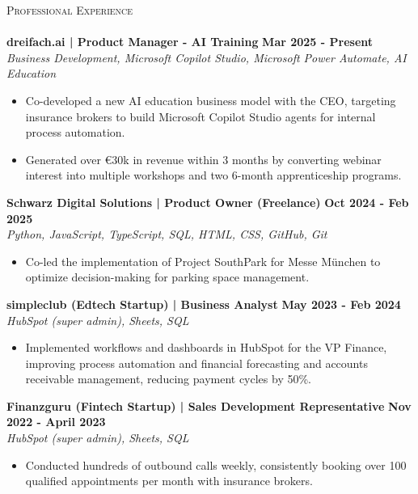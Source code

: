 \documentclass[a4paper]{article}
\newcommand{\lineunder} {
    \vspace*{-8pt} \\
    \hspace*{-18pt} \hrulefill \\
}
\newcommand{\header} [1] {
    {\hspace*{-18pt}\vspace*{6pt} \textsc{#1}}
    \vspace*{-6pt} \lineunder
}
\begin{document}
\header{Professional Experience}
\textbf{dreifach.ai | Product Manager - AI Training} \hfill \textbf{ Mar 2025 - Present}\\
\textit{Business Development, Microsoft Copilot Studio, Microsoft Power Automate, AI Education}
\vspace{-2mm}
\begin{itemize} \itemsep -2pt
    \item Co-developed a new AI education business model with the CEO, targeting insurance brokers to build Microsoft Copilot Studio agents for internal process automation.
    \item Generated over €30k in revenue within 3 months by converting webinar interest into multiple workshops and two 6-month apprenticeship programs.
\end{itemize}
\vspace{-1mm}
\textbf{Schwarz Digital Solutions | Product Owner (Freelance)} \hfill \textbf{ Oct 2024 - Feb 2025}\\
\textit{Python, JavaScript, TypeScript, SQL, HTML, CSS, GitHub, Git}
\vspace{-2mm}
\begin{itemize} \itemsep -2pt
	\item Co-led the implementation of Project SouthPark for Messe München to optimize decision-making for parking space management.
\end{itemize}
\vspace{-1mm}
\textbf{simpleclub (Edtech Startup) | Business Analyst} \hfill \textbf{ May 2023 - Feb 2024}\\
\textit{HubSpot (super admin), Sheets, SQL}\\
\vspace{-2mm}
\begin{itemize} \itemsep -2pt
	\item Implemented workflows and dashboards in HubSpot for the VP Finance, improving process automation and financial forecasting and accounts receivable management, reducing payment cycles by 50\%.
\end{itemize}
\vspace{-1mm}
\textbf{Finanzguru (Fintech Startup) | Sales Development Representative} \hfill \textbf{ Nov 2022 - April 2023}\\
\textit{HubSpot (super admin), Sheets, SQL}\\
\vspace{-2mm}
\begin{itemize} \itemsep -2pt
    \item Conducted hundreds of outbound calls weekly, consistently booking over 100 qualified appointments per month with insurance brokers.
\end{itemize}
\end{document}
